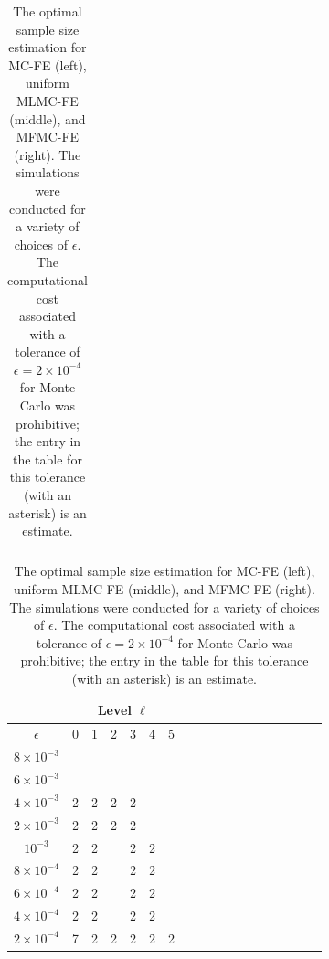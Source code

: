 \begin{table}[ht]
{\begin{tabular}{c|c|c|c|c|c|c|c|c|c|c|c|c|}
			\hline
	\end{tabular}
 \qquad
		\begin{tabular}{c|c|c|c|c|c|c|c|c|c|c|c|c|c|c|c|c|c|}
	    \cline{2-7}	
		&\multicolumn{6}{|c|}{ Level $\ell$}\\
			\hline
			\multicolumn{1}{|c|}{$\epsilon$}&0&1&2&3&4&5\\
			\hline
			\multicolumn{1}{|c|}{$8\times 10^{-3} $}&&&&&&\\
			\multicolumn{1}{|c|}{$6\times 10^{-3} $}&&&&&&\\
			\multicolumn{1}{|c|}{$4\times 10^{-3} $}&2&2&2&2&&\\
			\multicolumn{1}{|c|}{$2\times 10^{-3} $}&2&2&2&2&&\\
			\multicolumn{1}{|c|}{$10^{-3} $}&2&2&&2&2&\\
			\multicolumn{1}{|c|}{$8\times 10^{-4} $}&2&2&&2&2&\\
                \multicolumn{1}{|c|}{$6\times 10^{-4} $}&2&2&&2&2&\\
			\multicolumn{1}{|c|}{$4\times 10^{-4} $}&2&2&&2&2&\\
                \multicolumn{1}{|c|}{$2\times 10^{-4} $}&7&2&2&2&2&2\\
			\hline
	\end{tabular}
 
 }
	\caption{The optimal sample size estimation for MC-FE (left), uniform MLMC-FE (middle), and MFMC-FE (right). The simulations were conducted for a variety of choices of $\epsilon$. The computational cost associated with a tolerance of $\epsilon = 2\times 10^{-4}$ for Monte Carlo was prohibitive; the entry in the table for this tolerance (with an asterisk) is an estimate.}
	\label{Tab:SampleSize}
\end{table}


